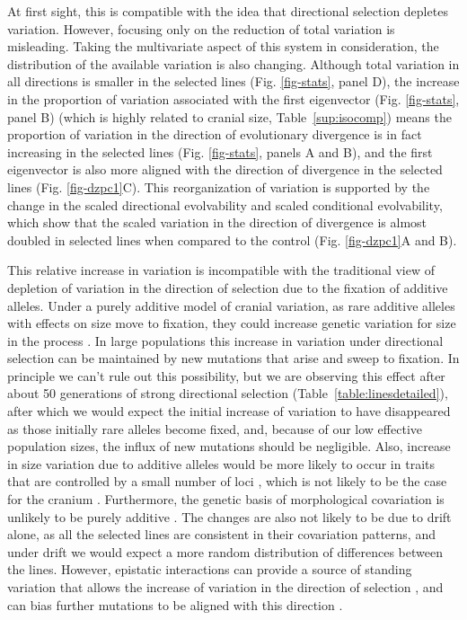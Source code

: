 \begin{refsection}
At first sight, this is compatible with the idea that directional
selection depletes variation. However, focusing only on the reduction of
total variation is misleading. Taking the multivariate aspect of this
system in consideration, the distribution of the available variation is
also changing. Although total variation in all directions is smaller in
the selected lines (Fig. \ref{fig-stats}, panel D), the increase in
the proportion of variation associated with the first eigenvector (Fig.
\ref{fig-stats}, panel B) (which is highly related to cranial size,
Table~\ref{sup:isocomp}) means the proportion of variation in the direction of
evolutionary divergence is in fact increasing in the selected lines
(Fig. \ref{fig-stats}, panels A and B), and the first eigenvector is
also more aligned with the direction of divergence in the selected lines
(Fig. \ref{fig-dzpc1}C). This reorganization of variation is supported
by the change in the scaled directional evolvability and scaled
conditional evolvability, which show that the scaled variation in the
direction of divergence is almost doubled in selected lines when
compared to the control (Fig. \ref{fig-dzpc1}A and B).

This relative increase in variation is incompatible with the traditional
view of depletion of variation in the direction of selection due to the
fixation of additive alleles. Under a purely additive model of cranial
variation, as rare additive alleles with effects on size move to
fixation, they could increase genetic variation for size in the process
\parencite{Burger1995-qd}. In large populations this increase in variation under
directional selection can be maintained by new mutations that arise and
sweep to fixation. In principle we can't rule out this possibility, but
we are observing this effect after about 50 generations of strong
directional selection (Table~\ref{table:linesdetailed}), after which we would expect the
initial increase of variation to have disappeared as those initially
rare alleles become fixed, and, because of our low effective population
sizes, the influx of new mutations should be negligible. Also, increase
in size variation due to additive alleles would be more likely to occur
in traits that are controlled by a small number of loci \parencite{Burger1995-qd, Jain2015-fj}, which is not likely to be the case for the cranium
\parencite{Leamy1999-dm, Wolf2005-nr, Porto2016-qc}. Furthermore, the genetic basis of
morphological covariation is unlikely to be purely additive
\parencite{Phillips2001-xb, Whitlock2002-yb}. The changes are also not likely to be
due to drift alone, as all the selected lines are consistent in their
covariation patterns, and under drift we would expect a more random
distribution of differences between the lines. However, epistatic
interactions can provide a source of standing variation that allows the
increase of variation in the direction of selection
\parencite{Cheverud1995-nm, Wagner2007-cx, Pavlicev2011-xm, Melo2015-bk}, and can bias
further mutations to be aligned with this direction
\parencite{Jones2007-xe, Jones2014-wj}.


\end{refsection}
